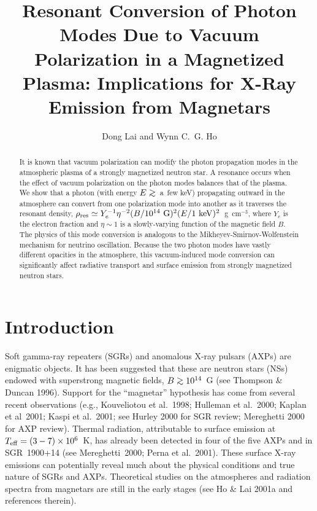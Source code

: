 \documentclass{aastex}
\def\go{\mathrel{\raise.3ex\hbox{$>$}\mkern-14mu
             \lower0.6ex\hbox{$\sim$}}}
\begin{document}
\title{Resonant Conversion of Photon Modes Due to Vacuum Polarization
in a Magnetized Plasma: Implications for X-Ray Emission from Magnetars}
\author{Dong Lai and Wynn C.~G. Ho}

\begin{abstract}
It is known that vacuum polarization can modify the photon 
propagation modes in the atmospheric plasma of a strongly 
magnetized neutron star. A resonance occurs when the effect 
of vacuum polarization on the photon modes balances that of the 
plasma. We show that a photon (with energy $E\go$~a~few keV)
propagating outward in the atmosphere can convert from one polarization mode
into another as it traverses the resonant density, $\rho_{\rm res}\simeq
Y_e^{-1}\eta^{-2}(B/10^{14}~{\rm G})^2(E/1~{\rm keV})^2$~g~cm$^{-3}$, where
$Y_e$ is the electron fraction and
$\eta\sim 1$ is a slowly-varying function of the magnetic field 
$B$. The physics of this 
mode conversion is analogous to the Mikheyev-Smirnov-Wolfenstein 
mechanism for neutrino oscillation. Because the two photon modes 
have vastly different opacities in the atmosphere,
this vacuum-induced mode conversion can significantly affect
radiative transport and surface emission from strongly magnetized 
neutron stars.
\end{abstract}

\section{Introduction}

Soft gamma-ray repeaters (SGRs) and anomalous X-ray pulsars (AXPs) are
enigmatic objects. It has been suggested that these are neutron
stars (NSs) endowed  with superstrong magnetic fields, $B\go 10^{14}$~G
(see Thompson \& Duncan 1996). Support for the ``magnetar''
hypothesis has come from several recent observations (e.g., Kouveliotou et
al.~1998; Hulleman et al.~2000; Kaplan et al~2001; Kaspi et al.~2001;
see Hurley 2000 for SGR review; Mereghetti 2000 for AXP review).
Thermal radiation, attributable to surface emission at
$T_{\rm eff}=(3-7)\times 10^6$~K, has already been detected
in four of the five AXPs
and in SGR~1900+14 (see Mereghetti~2000; Perna et al.~2001).
These surface X-ray emissions can potentially reveal much about the 
physical conditions and true nature of SGRs and
AXPs. Theoretical studies on the atmospheres and radiation spectra from
magnetars are still in the early stages (see Ho \& Lai 2001a
and references therein).
\end{document}
